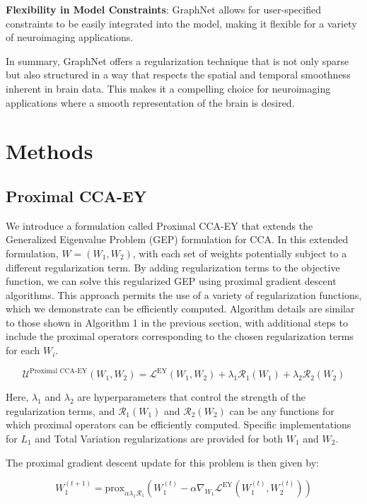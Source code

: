 \textbf{Flexibility in Model Constraints}: GraphNet allows for user-specified constraints to be easily integrated into the model, making it flexible for a variety of neuroimaging applications.

In summary, GraphNet offers a regularization technique that is not only sparse but also structured in a way that respects the spatial and temporal smoothness inherent in brain data.
This makes it a compelling choice for neuroimaging applications where a smooth representation of the brain is desired.


\section{Methods}
\subsection{Proximal CCA-EY}
We introduce a formulation called Proximal CCA-EY that extends the Generalized Eigenvalue Problem (GEP) formulation for CCA. In this extended formulation, \( W = (W_1, W_2) \), with each set of weights potentially subject to a different regularization term.
By adding regularization terms to the objective function, we can solve this regularized GEP using proximal gradient descent algorithms.
This approach permits the use of a variety of regularization functions, which we demonstrate can be efficiently computed.
Algorithm details are similar to those shown in Algorithm 1 in the previous section, with additional steps to include the proximal operators corresponding to the chosen regularization terms for each \( W_i \).

\begin{equation}
\label{eq:proximal-CCA-EY}
    \mathcal{U}^{\text{Proximal CCA-EY}}(W_1, W_2) = \mathcal{L}^{\text{EY}}(W_1, W_2) + \lambda_1 \mathcal{R}_1(W_1) + \lambda_2 \mathcal{R}_2(W_2)
\end{equation}

Here, \( \lambda_1 \) and \( \lambda_2 \) are hyperparameters that control the strength of the regularization terms, and \( \mathcal{R}_1(W_1) \) and \( \mathcal{R}_2(W_2) \) can be any functions for which proximal operators can be efficiently computed.
Specific implementations for \( L_1 \) and Total Variation regularizations are provided for both \( W_1 \) and \( W_2 \).

The proximal gradient descent update for this problem is then given by:

\begin{equation}
\label{eq:proximal-update}
    W_1^{(t+1)} = \text{prox}_{\alpha \lambda_1 \mathcal{R}_1}\left( W_1^{(t)} - \alpha \nabla_{W_1} \mathcal{L}^{\text{EY}}(W_1^{(t)}, W_2^{(t)}) \right)
\end{equation}

